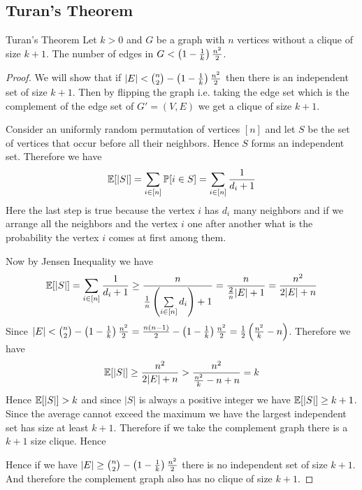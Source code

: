 \documentclass[twoside]{article}
\begin{document}
\subsection{Turan's Theorem}
\begin{Theorem}{Turan's Theorem}{}
	Let $k>0$ and $G$ be a graph with $n$ vertices without a clique of size $k+1$. The number of edges in $G < \left(1-\frac1k\right)\frac{n^2}{2}$. 
\end{Theorem}
\begin{proof}
	We will show that if $|E|< \binom{n}2-\left(1-\frac1k\right)\frac{n^2}2$ then there is an independent set of size $k+1$. Then by flipping the graph i.e. taking the edge set which is  the complement of the edge set of $G'=(V,E)$ we get a clique of size $k+1$.
	
	Consider an uniformly random permutation of vertices $[n]$ and let $S$ be the set of vertices that occur before all their neighbors. Hence $S$ forms an independent set. Therefore we have $$\mathbb{E}[|S|]=\sum_{i\in[n]}\mathbb{P}[i\in S]=\sum_{i\in [n]}\frac1{d_i+1}$$Here the last step is true because the vertex $i$ has $d_i$ many neighbors and if we arrange all the neighbors and the vertex $i$ one after another what is the probability the vertex $i$ comes at first among them. 
	
	Now by Jensen Inequality we have $$\mathbb{E}[|S|]=\sum_{i\in[n]}\frac{1}{d_i+1}\geq \frac{n}{\frac1n\left(\sum\limits_{i\in[n]}d_i\right)+1}=\frac{n}{\frac2n|E|+1}=\frac{n^2}{2|E|+n}$$Since  $|E|< \binom{n}2-\left(1-\frac1k\right)\frac{n^2}2=\frac{n(n-1)}2-\left(1-\frac1k\right)\frac{n^2}2=\frac12\left(\frac{n^2}k-n\right)$. Therefore we have $$\mathbb{E}[|S|]\geq \frac{n^2}{2|E|+n}>\frac{n^2}{\frac{n^2}k-n+n}=k$$Hence $\mathbb{E}[|S|]>k$ and since $|S|$ is always a positive integer we have $\mathbb{E}[|S|]\geq k+1$. Since the average cannot exceed the maximum we have the largest independent set has size at least $k+1$. Therefore if we take the complement graph there is a $k+1$ size clique. Hence
	
	Hence if we have $|E|\geq \binom{n}2-\left(1-\frac1k\right)\frac{n^2}2$ there is no independent set of size $k+1$. And therefore the complement graph also has no clique of size $k+1$.
\end{proof}
\end{document}
